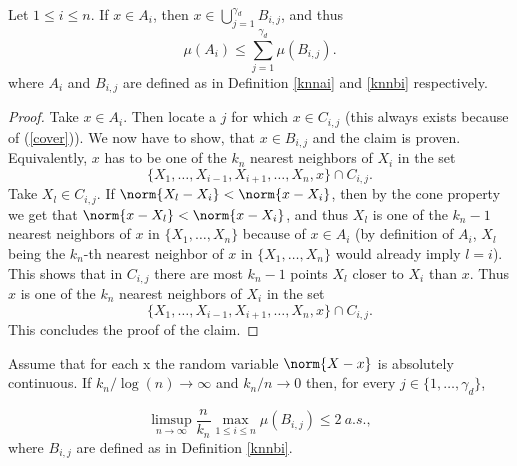 \begin{lemma}[$k$-NN covering] \label{knncoverlemma}
Let \(1 \leq i \leq n\). If \(x \in A_i\), then \(x \in \bigcup_{j=1}^{\gamma_d} B_{i,j}\), and thus
\[
    \mu(A_i) \leq \sum_{j=1}^{\gamma_d}\mu(B_{i,j}).
\]
where \(A_i\) and \(B_{i,j}\) are defined as in Definition \ref{knnai} and \ref{knnbi} respectively.
\end{lemma}

\begin{proof}
    Take \(x \in A_i\). Then locate a \(j\) for which \(x \in C_{i,j}\) (this always exists because of (\ref{cover})). We now have to show, that \(x \in B_{i, j}\) and the claim is proven. Equivalently, \(x\) has to be one of the \(k_n\) nearest neighbors of \(X_i\) in the set
    \[
        \{X_1, \ldots, X_{i-1},X_{i+1}, \ldots, X_n, x\} \cap C_{i, j}. 
    \]
    Take \(X_l \in C_{i,j}\). If \(\norm{X_l - X_i} < \norm{x - X_i}\), then by the cone property we get that \(\norm{x - X_l} < \norm{x - X_i}\), and thus \(X_l\) is one of the \(k_n - 1\) nearest neighbors of \(x\) in \(\{X_1, \ldots, X_n\}\) because of \(x \in A_i\) (by definition of \(A_i\), \(X_l\) being the \(k_n\)-th nearest neighbor of \(x\) in \(\{X_1, \ldots, X_n\}\) would already imply \(l = i\)). This shows that in \(C_{i,j}\) there are most \(k_n - 1\) points \(X_l\) closer to \(X_i\) than \(x\). Thus \(x\) is one of the \(k_n\) nearest neighbors of \(X_i\) in the set
    \[
        \{X_1, \ldots, X_{i-1},X_{i+1}, \ldots, X_n, x\} \cap C_{i, j}.
    \]
    This concludes the proof of the claim.
\end{proof}


\begin{lemma} \label{knnlemmatwo}
Assume that for each x the random variable \(\norm{X - x}\) is absolutely continuous.
If \(k_n / \log(n) \to \infty\) and \(k_n / n \to 0\) then, for every  \(j \in \{1, \ldots, \gamma_d\}\),

\[
    \limsup_{n \to \infty} \frac{n}{k_n}\max_{1 \leq i \leq n} \mu(B_{i, j}) \leq 2 \ a.s.,
\]
where \(B_{i,j}\) are defined as in Definition \ref{knnbi}.
\end{lemma}

